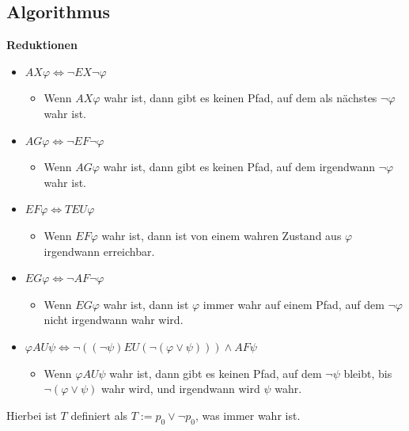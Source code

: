 \documentclass[a4paper,6pt]{article}
\begin{document}
\begin{multicols*}{3}
\subsection*{Algorithmus}

\textbf{Reduktionen}

\begin{itemize}
    \item $AX \varphi \Leftrightarrow \neg EX \neg \varphi$
        \begin{itemize}
            \item \tiny{Wenn $AX \varphi$ wahr ist, dann gibt es keinen Pfad, auf dem als nächstes $\neg \varphi$ wahr ist.}
        \end{itemize}
    \item $AG \varphi \Leftrightarrow \neg EF \neg \varphi$
        \begin{itemize}
            \item \tiny{Wenn $AG \varphi$ wahr ist, dann gibt es keinen Pfad, auf dem irgendwann $\neg \varphi$ wahr ist.}
        \end{itemize}
    \item $EF \varphi \Leftrightarrow T EU \varphi$
        \begin{itemize}
            \item \tiny{Wenn $EF \varphi$ wahr ist, dann ist von einem wahren Zustand aus $\varphi$ irgendwann erreichbar.}
        \end{itemize}
    \item $EG \varphi \Leftrightarrow \neg AF \neg \varphi$
        \begin{itemize}
            \item \tiny{Wenn $EG \varphi$ wahr ist, dann ist $\varphi$ immer wahr auf einem Pfad, auf dem $\neg \varphi$ nicht irgendwann wahr wird.}
        \end{itemize}
    \item $\varphi AU \psi \Leftrightarrow \neg ((\neg \psi) EU (\neg (\varphi \lor \psi))) \land AF \psi$
        \begin{itemize}
            \item \tiny{Wenn $\varphi AU \psi$ wahr ist, dann gibt es keinen Pfad, auf dem $\neg \psi$ bleibt, bis $\neg (\varphi \lor \psi)$ wahr wird, und irgendwann wird $\psi$ wahr.}
        \end{itemize}
\end{itemize}

Hierbei ist $T$ definiert als $T := p_0 \lor \neg p_0$, was immer wahr ist.


\end{multicols*}
\end{document}
